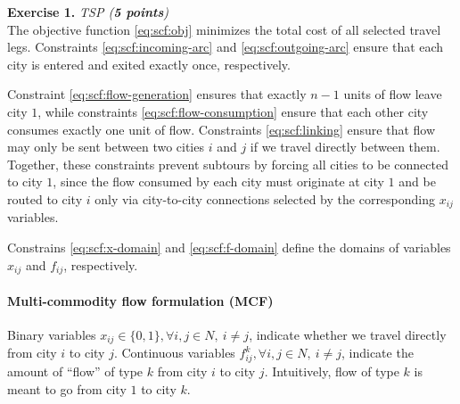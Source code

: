 \documentclass[a4paper]{scrartcl}
\newcounter{exc}
\newenvironment{exercise}[1]%
{\refstepcounter{exc}\textbf{Exercise 1.\arabic{exc}} \emph{#1}\\}
{

\hrulefill\medskip}%
\theoremstyle{definition}
\begin{document}
\begin{exercise}{TSP (\textbf{5 points})}
	The objective function \eqref{eq:scf:obj} minimizes the total cost of all selected travel legs.
	Constraints \eqref{eq:scf:incoming-arc} and \eqref{eq:scf:outgoing-arc} ensure that each city is entered and exited exactly once, respectively.
	
	Constraint \eqref{eq:scf:flow-generation} ensures that exactly $n-1$ units of flow leave city $1$,
	while constraints \eqref{eq:scf:flow-consumption} ensure that each other city consumes exactly one unit of flow.
	Constraints \eqref{eq:scf:linking} ensure that flow may only be sent between two cities $i$ and $j$ if we travel directly between them.
	Together, these constraints prevent subtours by forcing all cities to be connected to city $1$, since the flow consumed by each city must originate at city $1$ and be routed to city $i$ only via city-to-city connections selected by the corresponding $x_{ij}$ variables.
	
	Constrains \eqref{eq:scf:x-domain} and \eqref{eq:scf:f-domain} define the domains of variables $x_{ij}$ and $f_{ij}$, respectively.
	
	
	\paragraph{Multi-commodity flow formulation (MCF)}
	
	Binary variables $x_{ij} \in \{0, 1\}, \forall i,j \in N,\ i \neq j$, indicate whether we travel directly from city $i$ to city $j$.
	Continuous variables $f_{ij}^k, \forall i,j \in N,\ i \neq j$, indicate the amount of ``flow'' of type $k$ from city $i$ to city $j$. Intuitively, flow of type $k$ is meant to go from city $1$ to city $k$.
	

\end{exercise}
\end{document}
